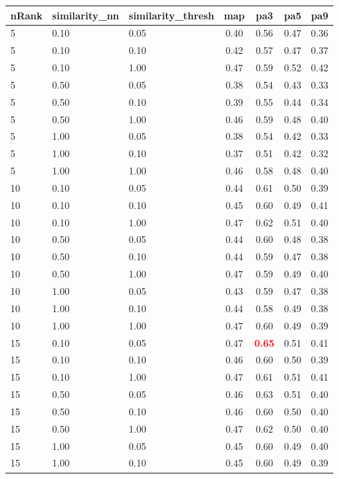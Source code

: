   
\begin{table} 
\begin{center} 
\scriptsize 
 \setlength{\tabcolsep}{.16667em} 
\begin{tabular}{lllcccc} 
nRank & similarity\_nn & similarity\_thresh & map & pa3 & pa5 & pa9 \\ 
\hline 
 5 & 0.10 & 0.05 & 0.40 & 0.56 & 0.47 & 0.36 \\ 
 5 & 0.10 & 0.10 & 0.42 & 0.57 & 0.47 & 0.37 \\ 
 5 & 0.10 & 1.00 & 0.47 & 0.59 & 0.52 & 0.42 \\ 
 5 & 0.50 & 0.05 & 0.38 & 0.54 & 0.43 & 0.33 \\ 
 5 & 0.50 & 0.10 & 0.39 & 0.55 & 0.44 & 0.34 \\ 
 5 & 0.50 & 1.00 & 0.46 & 0.59 & 0.48 & 0.40 \\ 
 5 & 1.00 & 0.05 & 0.38 & 0.54 & 0.42 & 0.33 \\ 
 5 & 1.00 & 0.10 & 0.37 & 0.51 & 0.42 & 0.32 \\ 
 5 & 1.00 & 1.00 & 0.46 & 0.58 & 0.48 & 0.40 \\ 
10 & 0.10 & 0.05 & 0.44 & 0.61 & 0.50 & 0.39 \\ 
10 & 0.10 & 0.10 & 0.45 & 0.60 & 0.49 & 0.41 \\ 
10 & 0.10 & 1.00 & 0.47 & 0.62 & 0.51 & 0.40 \\ 
10 & 0.50 & 0.05 & 0.44 & 0.60 & 0.48 & 0.38 \\ 
10 & 0.50 & 0.10 & 0.44 & 0.59 & 0.47 & 0.38 \\ 
10 & 0.50 & 1.00 & 0.47 & 0.59 & 0.49 & 0.40 \\ 
10 & 1.00 & 0.05 & 0.43 & 0.59 & 0.47 & 0.38 \\ 
10 & 1.00 & 0.10 & 0.44 & 0.58 & 0.49 & 0.38 \\ 
10 & 1.00 & 1.00 & 0.47 & 0.60 & 0.49 & 0.39 \\ 
15 & 0.10 & 0.05 & 0.47 & \textbf{\textcolor{red}{0.65}} & 0.51 & 0.41 \\ 
15 & 0.10 & 0.10 & 0.46 & 0.60 & 0.50 & 0.39 \\ 
15 & 0.10 & 1.00 & 0.47 & 0.61 & 0.51 & 0.41 \\ 
15 & 0.50 & 0.05 & 0.46 & 0.63 & 0.51 & 0.40 \\ 
15 & 0.50 & 0.10 & 0.46 & 0.60 & 0.50 & 0.40 \\ 
15 & 0.50 & 1.00 & 0.47 & 0.62 & 0.50 & 0.40 \\ 
15 & 1.00 & 0.05 & 0.45 & 0.60 & 0.49 & 0.40 \\ 
15 & 1.00 & 0.10 & 0.45 & 0.60 & 0.49 & 0.39 \\ 

\end{tabular}
\end{center}
\end{table}
